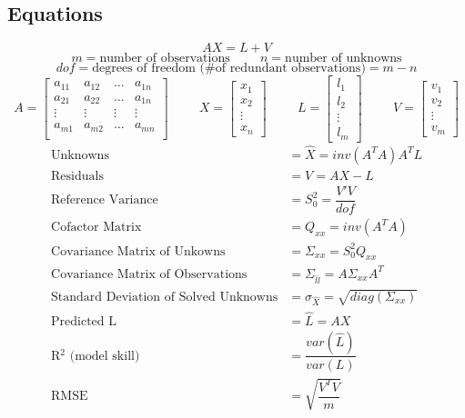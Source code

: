 \subsection{Equations}
\[
AX=L+V 
\]
\[
m = \text{number of observations} \hspace{1cm} 
n = \text{number of unknowns}
\]
\[
dof = \text{degrees of freedom (\# of redundant observations)} = m-n
\]
\[
A = \begin{bmatrix}
a_{11} & a_{12} & \dots & a_{1n} \\
a_{21} & a_{22} & \dots & a_{1n} \\
\vdots & \vdots & \vdots& \vdots \\
a_{m1} & a_{m2} & \dots & a_{mn} \\
\end{bmatrix}
\hspace{1cm}
X = 
\begin{bmatrix}
x_1 \\ x_2 \\ \vdots \\ x_n
\end{bmatrix}
\hspace{1cm}
L = 
\begin{bmatrix}
l_1 \\ l_2 \\ \vdots \\ l_m
\end{bmatrix}
\hspace{1cm}
V = 
\begin{bmatrix}
v_1 \\ v_2 \\ \vdots \\ v_m
\end{bmatrix}
\]
\begin{align*}
\text{Unknowns} &= \hat{X} = inv(A^TA)A^TL\\
\text{Residuals} &= V = AX - L\\
\text{Reference Variance} &= S_0^2 = \dfrac{V'V}{dof} \\
\text{Cofactor Matrix} &= Q_{xx} = inv(A^TA) \\
\text{Covariance Matrix of Unkowns} &= \Sigma_{xx} = S_0^2 Q_{xx} \\
\text{Covariance Matrix of Observations} &= \Sigma_{\hat{l}\hat{l}} = A \Sigma_{xx} A^T \\
\text{Standard Deviation of Solved Unknowns} &= \sigma_{\hat{X}} = \sqrt{diag(\Sigma_{xx})} \\
\text{Predicted L} &= \hat{L} = AX \\
\text{R$^2$ (model skill)} &= \dfrac{var(\hat{L})}{var(L)} \\
\text{RMSE } &= \sqrt{\dfrac{V^TV}{m}} \\
\end{align*}
\clearpage
